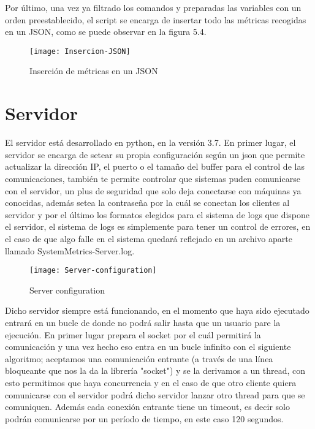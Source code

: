 \documentclass[ spanish, a4paper, 12pt, oneside]{report}
\begin{document}
Por último, una vez ya filtrado los comandos y preparadas las variables con un orden preestablecido, el script se encarga de insertar todo las métricas recogidas en un JSON, como se 
puede observar en la figura 5.4. \\ 

\begin{figure}[!h]
   \centering
   \texttt{[image: Insercion-JSON]}\\
      \caption{\label{fig: Inserción de métricas en un JSON} Inserción de métricas en un JSON}
\end{figure}

\section{Servidor}

El servidor está desarrollado en python, en la versión 3.7. En primer lugar, el servidor se encarga de setear su propia configuración según un json 
que permite actualizar la dirección IP, el puerto o el tamaño del buffer para el control de las comunicaciones, también te permite controlar que sistemas puden 
comunicarse con el servidor, un plus de seguridad que solo deja conectarse con máquinas ya conocidas, además setea la contraseña por la cuál se conectan los clientes 
al servidor y por el último los formatos elegidos para el sistema de logs que dispone el servidor, el sistema de logs es simplemente para tener un control de errores, 
en el caso de que algo falle en el sistema quedará reflejado en un archivo aparte llamado SystemMetrics-Server.log.\\


\begin{figure}[!h]
   \centering
   \texttt{[image: Server-configuration]}\\
      \caption{\label{fig: Server configuration} Server configuration}
\end{figure}

Dicho servidor siempre está funcionando, en el momento que haya sido ejecutado entrará en un bucle de donde no podrá salir hasta que un usuario pare la ejecución. 
En primer lugar prepara el socket por el cuál permitirá la comunicación y una vez hecho eso entra en un bucle infinito con el siguiente algoritmo; aceptamos una comunicación 
entrante (a través de una línea bloqueante que nos la da la líbrería "socket") y se la derivamos a un thread, con esto permitimos que haya concurrencia y en el caso de que 
otro cliente quiera comunicarse con el servidor podrá dicho servidor lanzar otro thread para que se comuniquen. Además cada conexión entrante tiene un timeout, es decir solo podrán 
comunicarse por un período de tiempo, en este caso 120 segundos. \\
\end{document}
